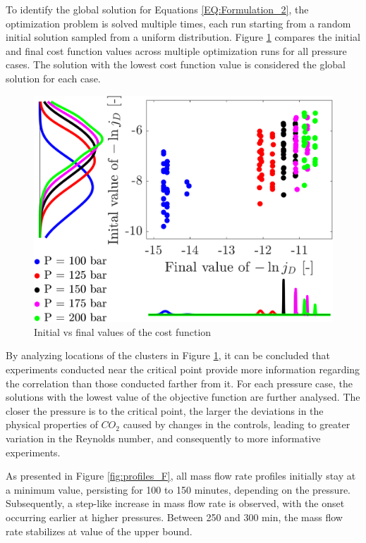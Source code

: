 \documentclass[../Article_Sensitivity_Analsysis.tex]{subfiles}
\begin{document}
	
	To identify the global solution for Equations \ref{EQ:Formulation_2}, the optimization problem is solved multiple times, each run starting from a random initial solution sampled from a uniform distribution. Figure \ref{fig:scatter} compares the initial and final cost function values across multiple optimization runs for all pressure cases. The solution with the lowest cost function value is considered the global solution for each case.
	
	\begin{figure}[h!]
		\centering
		\includegraphics[width=0.90\columnwidth]{Figures/Results/scatter.png}	
		\caption{Initial vs final values of the cost function}
		\label{fig:scatter}
	\end{figure}
	
	By analyzing locations of the clusters in Figure \ref{fig:scatter}, it can be concluded that experiments conducted near the critical point provide more information regarding the correlation than those conducted farther from it. For each pressure case, the solutions with the lowest value of the objective function are further analysed. The closer the pressure is to the critical point, the larger the deviations in the physical properties of $CO_2$ caused by changes in the controls, leading to greater variation in the Reynolds number, and consequently to more informative experiments. 
	
	As presented in Figure \ref{fig:profiles_F}, all mass flow rate profiles initially stay at a minimum value, persisting for 100 to 150 minutes, depending on the pressure. Subsequently, a step-like increase in mass flow rate is observed, with the onset occurring earlier at higher pressures. Between 250 and 300 min, the mass flow rate stabilizes at value of the upper bound.
	
\end{document}
